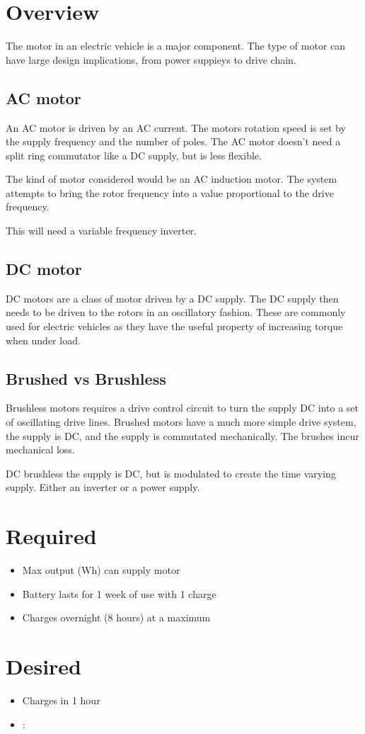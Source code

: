 \documentclass{article}
\begin{document}
\section{Overview}
The motor in an electric vehicle is a major component.
The type of motor can have large design implications, from power suppieys to drive chain.
\subsection{AC motor}
An AC motor is driven by an AC current.
The motors rotation speed is set by the supply frequency and the number of poles.
The AC motor doesn't need a split ring commutator like a DC supply, but is less flexible.

The kind of motor considered would be an AC induction motor.
The system attempts to bring the rotor frequency into a value proportional to the drive frequency.

This will need a variable frequency inverter.

\subsection{DC motor}
DC motors are a class of motor driven by a DC supply.
The DC supply then needs to be driven to the rotors in an oscillatory fashion. 
These are commonly used for electric vehicles as they have the useful property of increasing torque when under load. 
\subsection{Brushed vs Brushless}
Brushless motors requires a drive control circuit to turn the supply DC into a set of oscillating drive lines.
Brushed motors have a much more simple drive system, the supply is DC, and the supply is commutated mechanically.
The brushes incur mechanical loss.

DC brushless the supply is DC, but is modulated to create the time varying supply.
Either an inverter or a power supply.

\section{Required}
\begin{itemize}
    \item Max output (Wh) can supply motor
    \item Battery lasts for 1 week of use with 1 charge
    \item Charges overnight (8 hours) at a maximum
\end{itemize}
\section{Desired}
\begin{itemize}
    \item Charges in 1 hour
    \item :
\end{itemize}
\end{document}
